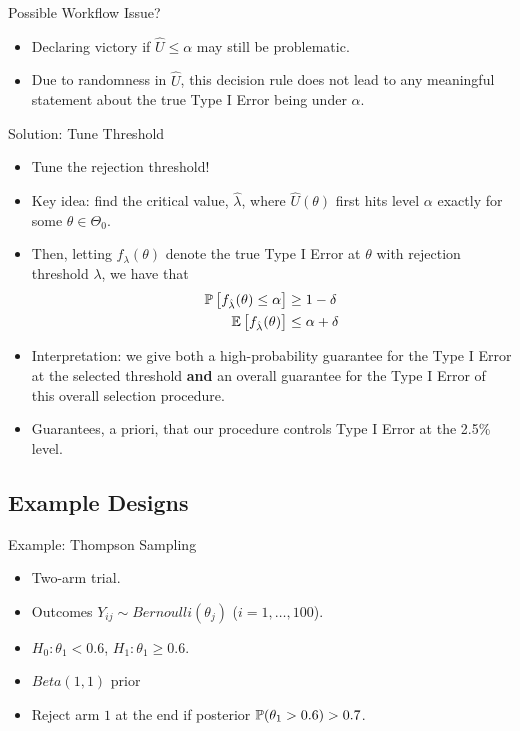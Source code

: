 \begin{frame}{Possible Workflow Issue?}
\begin{itemize}
    \item Declaring victory if $\hat{U} \leq \alpha$ may still be problematic.
    \item Due to randomness in $\hat{U}$, this decision rule does not lead to any meaningful statement about the true Type I Error being under $\alpha$.
\end{itemize}
\end{frame}

\begin{frame}{Solution: Tune Threshold}
\begin{itemize}
    \item Tune the rejection threshold!
    \item Key idea: find the critical value, $\hat{\lambda}$, where $\hat{U}(\theta)$ first hits level $\alpha$ exactly for some $\theta \in \Theta_0$.
    \item Then, letting $f_\lambda(\theta)$ denote the true Type I Error at $\theta$ with rejection threshold $\lambda$, we have that
        \begin{align*}
            \mathbb{P}\left[f_{\hat{\lambda}}(\theta) \leq \alpha\right] &\geq 1-\delta \\
            \mathbb{E}\left[f_{\hat{\lambda}}(\theta)\right] 
            &\leq \alpha + \delta
        \end{align*}
    \item Interpretation: we give both a high-probability guarantee for the Type I Error at the selected threshold \textbf{and} an overall guarantee for the Type I Error of this overall selection procedure.
    \item Guarantees, a priori, that our procedure controls Type I Error at the 2.5\% level.
\end{itemize}
\end{frame}

\subsection{Example Designs}

\begin{frame}{Example: Thompson Sampling}
\begin{itemize}
    \item Two-arm trial.
    \item Outcomes $Y_{ij} \sim Bernoulli(\theta_j)$ ($i=1,\ldots,100$).
    \item $H_0: \theta_1 < 0.6$, $H_1: \theta_1 \geq 0.6$.
    \item $Beta(1,1)$ prior
    \item Reject arm $1$ at the end if posterior $\mathbb{P}(\theta_1  > 0.6) > 0.7$.
\end{itemize}
\end{frame}

